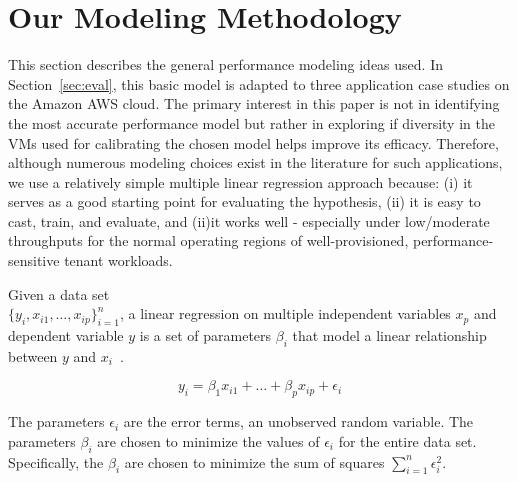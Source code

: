 \section{Our Modeling Methodology}
\label{sec:model}
\vspace{10pt}

This section describes the general performance modeling ideas used. In Section~\ref{sec:eval}, %
this basic model is adapted to three application case studies on the Amazon AWS cloud. The primary interest in this paper is not in identifying the most accurate performance model but rather in exploring if diversity in the VMs used for calibrating the chosen model helps improve its efficacy. 
Therefore, although numerous modeling choices exist in the literature for such applications, we use a relatively simple multiple linear regression approach because: (i) it serves as a good starting point for evaluating the hypothesis, (ii) it is easy to cast, train, and evaluate, and (ii)it  works well - especially under low/moderate throughputs for the normal operating regions of well-provisioned, performance-sensitive tenant workloads.

 Given a data set \\ $\{y_i,x_{i1},\ldots,x_{ip}\}^n_{i=1}$, a linear regression on multiple independent variables $x_{p}$ and dependent variable $y$ is a set of parameters $\beta_i$ that model a linear relationship between $y$ and $x_{i}$~\cite{CMUStatsBook}.

\begin{displaymath}{
y_i = \beta_1 x_{i1}+\ldots+\beta_{p}x_{ip}+\epsilon_i
}\end{displaymath}

The parameters $\epsilon_i$ are the error terms, an unobserved random variable.  The parameters $\beta_i$ are chosen to minimize the values of $\epsilon_i$ for the entire data set.  Specifically, the $\beta_i$ are chosen to minimize the sum of squares $\sum_{i=1}^{n} \epsilon^2_i$.


